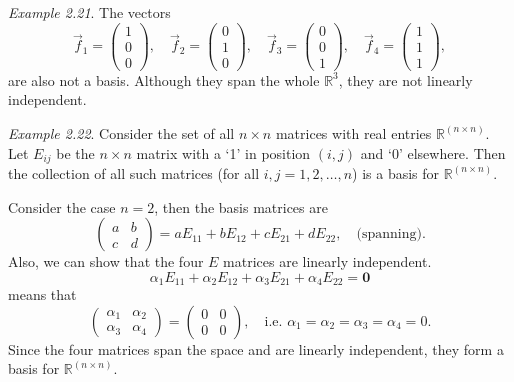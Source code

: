 \documentclass[
  letterpaper,
  DIV=11,
  numbers=noendperiod]{scrartcl}
\theoremstyle{remark}
\begin{document}
\emph{Example 2.21}. The vectors
\[\vec{f}_{1} =  \scriptscriptstyle \begin{pmatrix}   1\\ 0 \\ 0   \end{pmatrix} \textstyle, \quad \vec{f}_{2} =  \scriptscriptstyle \begin{pmatrix}   0\\ 1 \\ 0   \end{pmatrix} \textstyle, \quad \vec{f}_{3} =  \scriptscriptstyle \begin{pmatrix}   0\\ 0 \\ 1  \end{pmatrix} \textstyle, \quad  \vec{f}_{4} =  \scriptscriptstyle \begin{pmatrix}   1\\ 1 \\ 1   \end{pmatrix} \textstyle ,\]
are also not a basis. Although they span the whole \(\mathbb{R}^{3}\),
they are not linearly independent.

\emph{Example 2.22}. Consider the set of all \(n\times n\) matrices with
real entries \(\mathbb{R}^{(n\times n)}\). Let \(E_{ij}\) be the
\(n\times n\) matrix with a `1' in position \((i,j)\) and `0' elsewhere.
Then the collection of all such matrices (for all \(i,j=1,2,\ldots,n\))
is a basis for \(\mathbb{R}^{(n\times n)}\).

Consider the case \(n=2\), then the basis matrices are
\[\left(\begin{array}{cc}
 a & b\\
 c & d
 \end{array}\right)=aE_{11}+bE_{12}+cE_{21}+dE_{22},\quad\textrm{(spanning)}.\]
Also, we can show that the four \(E\) matrices are linearly independent.
\[\alpha _{1}E_{11}+\alpha _{2}E_{12}+\alpha _{3}E_{21}+\alpha _{4}E_{22}=\mathbf{0}\]
means that \[\left(\begin{array}{cc}
 \alpha _{1} & \alpha _{2}\\
 \alpha _{3} & \alpha _{4}
 \end{array}\right) = \left(\begin{array}{cc}
 0 & 0\\
 0 & 0
 \end{array}\right),\quad\textrm{i.e.   }\alpha _{1}=\alpha _{2}=\alpha _{3}=\alpha _{4}=0.\]
Since the four matrices span the space and are linearly independent,
they form a basis for \(\mathbb{R}^{(n\times n)}\).
\end{document}
